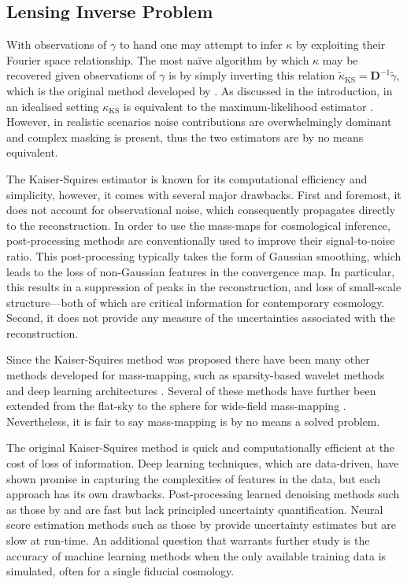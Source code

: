\documentclass[fleqn,usenatbib]{mnras}
\begin{document}
\subsection{Lensing Inverse Problem}\label{subsec:weak_lensing_inverse}

With observations of $\gamma$ to hand one may attempt to infer $\kappa$ by exploiting their Fourier space relationship. The most na\"ive algorithm by which $\kappa$ may be recovered given observations of $\gamma$ is by simply inverting this relation $\tilde{\kappa}_{\text{KS}} = \mathbf{D}^{-1} \tilde{\gamma}$, which is the original method developed by \citet{kaiser1993mapping}. As discussed in the introduction, in an idealised setting $\kappa_{\text{KS}}$ is equivalent to the maximum-likelihood estimator \citep{price2021sparsecelest}. However, in realistic scenarios noise contributions are overwhelmingly dominant and complex masking is present, thus the two estimators are by no means equivalent.

The Kaiser-Squires estimator is known for its computational efficiency and simplicity, however, it comes with several major drawbacks. First and foremost, it does not account for observational noise, which consequently propagates directly to the reconstruction. In order to use the mass-maps for cosmological inference, post-processing methods are conventionally used to improve their signal-to-noise ratio. This post-processing typically takes the form of Gaussian smoothing, which leads to the loss of non-Gaussian features in the convergence map. In particular, this results in a suppression of peaks in the reconstruction, and loss of small-scale structure---both of which are critical information for contemporary cosmology. Second, it does not provide any measure of the uncertainties associated with the reconstruction.

Since the Kaiser-Squires method was proposed there have been many other methods developed for mass-mapping, such as sparsity-based wavelet methods \citep{lanusse2016high, price2019sparse, price2020sparse, price2021sparsehypoth, starck2021weak} and deep learning architectures \citep{jeffrey2020deep,shirasaki2021noise, remy2023probabilistic}. Several of these methods have further been extended from the flat-sky to the sphere for wide-field mass-mapping \citep{wallis2022mapping,chang2018dark, price2021sparse}. Nevertheless, it is fair to say mass-mapping is by no means a solved problem. 

The original Kaiser-Squires method is quick and computationally efficient at the cost of loss of information. Deep learning techniques, which are data-driven, have shown promise in capturing the complexities of features in the data, but each approach has its own drawbacks. Post-processing learned denoising methods such as those by \citet{jeffrey2020deep} and \citet{shirasaki2021noise} are fast but lack principled uncertainty quantification. Neural score estimation methods such as those by \citet{remy2023probabilistic} provide uncertainty estimates but are slow at run-time. An additional question that warrants further study is the accuracy of machine learning methods when the only available training data is simulated, often for a single fiducial cosmology.
\end{document}
